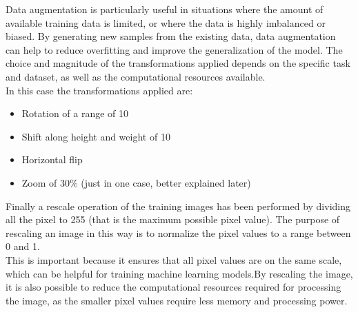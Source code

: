 \documentclass{article}
\begin{document}
Data augmentation is particularly useful in situations where the amount of available training data is limited, or where the data is highly imbalanced or biased. By generating new samples from the existing data, data augmentation can help to reduce overfitting and improve the generalization of the model.
The choice and magnitude of the transformations applied depends on the specific task and dataset, as well as the computational resources available.\\
In this case the transformations applied are:
\begin{itemize}
    \item Rotation of a range of 10
    \item Shift along height and weight of 10
    \item Horizontal flip
    \item Zoom of 30\% (just in one case, better explained later)
\end{itemize}
Finally a rescale operation of the training images has been performed by dividing all the pixel to 255 (that is the maximum possible pixel value). The purpose of rescaling an image in this way is to normalize the pixel values to a range between 0 and 1.\\
This is important because it ensures that all pixel values are on the same scale, which can be helpful for training machine learning models.By rescaling the image, it is also possible to reduce the computational resources required for processing the image, as the smaller pixel values require less memory and processing power.
\end{document}

